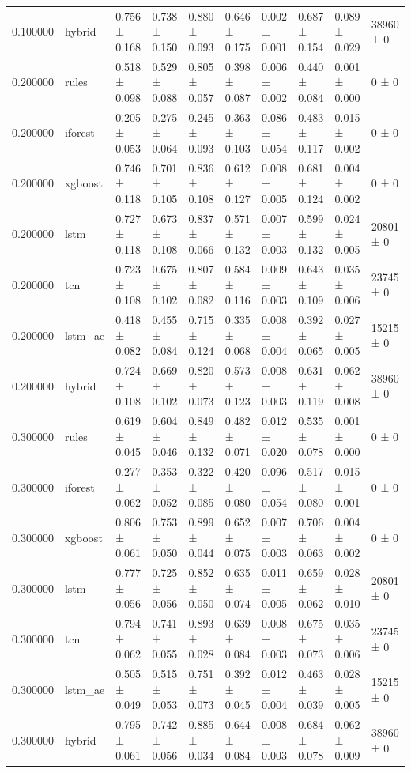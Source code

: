 \begin{tabular}{rlllllllll}
0.100000 & hybrid & 0.756 ± 0.168 & 0.738 ± 0.150 & 0.880 ± 0.093 & 0.646 ± 0.175 & 0.002 ± 0.001 & 0.687 ± 0.154 & 0.089 ± 0.029 & 38960 ± 0 \\
0.200000 & rules & 0.518 ± 0.098 & 0.529 ± 0.088 & 0.805 ± 0.057 & 0.398 ± 0.087 & 0.006 ± 0.002 & 0.440 ± 0.084 & 0.001 ± 0.000 & 0 ± 0 \\
0.200000 & iforest & 0.205 ± 0.053 & 0.275 ± 0.064 & 0.245 ± 0.093 & 0.363 ± 0.103 & 0.086 ± 0.054 & 0.483 ± 0.117 & 0.015 ± 0.002 & 0 ± 0 \\
0.200000 & xgboost & 0.746 ± 0.118 & 0.701 ± 0.105 & 0.836 ± 0.108 & 0.612 ± 0.127 & 0.008 ± 0.005 & 0.681 ± 0.124 & 0.004 ± 0.002 & 0 ± 0 \\
0.200000 & lstm & 0.727 ± 0.118 & 0.673 ± 0.108 & 0.837 ± 0.066 & 0.571 ± 0.132 & 0.007 ± 0.003 & 0.599 ± 0.132 & 0.024 ± 0.005 & 20801 ± 0 \\
0.200000 & tcn & 0.723 ± 0.108 & 0.675 ± 0.102 & 0.807 ± 0.082 & 0.584 ± 0.116 & 0.009 ± 0.003 & 0.643 ± 0.109 & 0.035 ± 0.006 & 23745 ± 0 \\
0.200000 & lstm\_ae & 0.418 ± 0.082 & 0.455 ± 0.084 & 0.715 ± 0.124 & 0.335 ± 0.068 & 0.008 ± 0.004 & 0.392 ± 0.065 & 0.027 ± 0.005 & 15215 ± 0 \\
0.200000 & hybrid & 0.724 ± 0.108 & 0.669 ± 0.102 & 0.820 ± 0.073 & 0.573 ± 0.123 & 0.008 ± 0.003 & 0.631 ± 0.119 & 0.062 ± 0.008 & 38960 ± 0 \\
0.300000 & rules & 0.619 ± 0.045 & 0.604 ± 0.046 & 0.849 ± 0.132 & 0.482 ± 0.071 & 0.012 ± 0.020 & 0.535 ± 0.078 & 0.001 ± 0.000 & 0 ± 0 \\
0.300000 & iforest & 0.277 ± 0.062 & 0.353 ± 0.052 & 0.322 ± 0.085 & 0.420 ± 0.080 & 0.096 ± 0.054 & 0.517 ± 0.080 & 0.015 ± 0.001 & 0 ± 0 \\
0.300000 & xgboost & 0.806 ± 0.061 & 0.753 ± 0.050 & 0.899 ± 0.044 & 0.652 ± 0.075 & 0.007 ± 0.003 & 0.706 ± 0.063 & 0.004 ± 0.002 & 0 ± 0 \\
0.300000 & lstm & 0.777 ± 0.056 & 0.725 ± 0.056 & 0.852 ± 0.050 & 0.635 ± 0.074 & 0.011 ± 0.005 & 0.659 ± 0.062 & 0.028 ± 0.010 & 20801 ± 0 \\
0.300000 & tcn & 0.794 ± 0.062 & 0.741 ± 0.055 & 0.893 ± 0.028 & 0.639 ± 0.084 & 0.008 ± 0.003 & 0.675 ± 0.073 & 0.035 ± 0.006 & 23745 ± 0 \\
0.300000 & lstm\_ae & 0.505 ± 0.049 & 0.515 ± 0.053 & 0.751 ± 0.073 & 0.392 ± 0.045 & 0.012 ± 0.004 & 0.463 ± 0.039 & 0.028 ± 0.005 & 15215 ± 0 \\
0.300000 & hybrid & 0.795 ± 0.061 & 0.742 ± 0.056 & 0.885 ± 0.034 & 0.644 ± 0.084 & 0.008 ± 0.003 & 0.684 ± 0.078 & 0.062 ± 0.009 & 38960 ± 0 \\
\bottomrule
\end{tabular}
